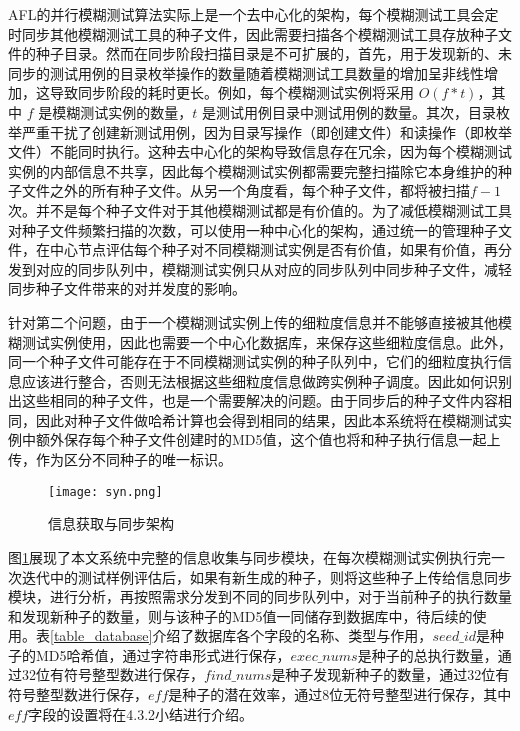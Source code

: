\documentclass[master]{thesis-uestc}
\begin{document}
AFL的并行模糊测试算法实际上是一个去中心化的架构，每个模糊测试工具会定时同步其他模糊测试工具的种子文件，因此需要扫描各个模糊测试工具存放种子文件的种子目录。然而在同步阶段扫描目录是不可扩展的，首先，用于发现新的、未同步的测试用例的目录枚举操作的数量随着模糊测试工具数量的增加呈非线性增加，这导致同步阶段的耗时更长。例如，每个模糊测试实例将采用 $O(f*t)$，其中 $f$ 是模糊测试实例的数量，$t$ 是测试用例目录中测试用例的数量。其次，目录枚举严重干扰了创建新测试用例，因为目录写操作（即创建文件）和读操作（即枚举文件）不能同时执行。这种去中心化的架构导致信息存在冗余，因为每个模糊测试实例的内部信息不共享，因此每个模糊测试实例都需要完整扫描除它本身维护的种子文件之外的所有种子文件。从另一个角度看，每个种子文件，都将被扫描$f-1$次。并不是每个种子文件对于其他模糊测试都是有价值的。为了减低模糊测试工具对种子文件频繁扫描的次数，可以使用一种中心化的架构，通过统一的管理种子文件，在中心节点评估每个种子对不同模糊测试实例是否有价值，如果有价值，再分发到对应的同步队列中，模糊测试实例只从对应的同步队列中同步种子文件，减轻同步种子文件带来的对并发度的影响。

针对第二个问题，由于一个模糊测试实例上传的细粒度信息并不能够直接被其他模糊测试实例使用，因此也需要一个中心化数据库，来保存这些细粒度信息。此外，同一个种子文件可能存在于不同模糊测试实例的种子队列中，它们的细粒度执行信息应该进行整合，否则无法根据这些细粒度信息做跨实例种子调度。因此如何识别出这些相同的种子文件，也是一个需要解决的问题。由于同步后的种子文件内容相同，因此对种子文件做哈希计算也会得到相同的结果，因此本系统将在模糊测试实例中额外保存每个种子文件创建时的MD5值，这个值也将和种子执行信息一起上传，作为区分不同种子的唯一标识。

\begin{figure}[!htbp]
    \vspace{6pt}
    \centering
    \texttt{[image: syn.png]}
    \caption{信息获取与同步架构}
    \label{syn}
\end{figure}

图\ref{syn}展现了本文系统中完整的信息收集与同步模块，在每次模糊测试实例执行完一次迭代中的测试样例评估后，如果有新生成的种子，则将这些种子上传给信息同步模块，进行分析，再按照需求分发到不同的同步队列中，对于当前种子的执行数量和发现新种子的数量，则与该种子的MD5值一同储存到数据库中，待后续的使用。表\ref{table_database}介绍了数据库各个字段的名称、类型与作用，$seed\_id$是种子的MD5哈希值，通过字符串形式进行保存，$exec\_nums$是种子的总执行数量，通过32位有符号整型数进行保存，$find\_nums$是种子发现新种子的数量，通过32位有符号整型数进行保存，$eff$是种子的潜在效率，通过8位无符号整型进行保存，其中$eff$字段的设置将在4.3.2小结进行介绍。
\end{document}
